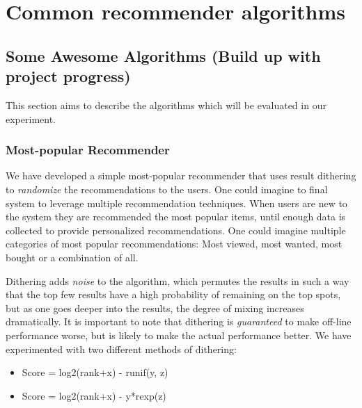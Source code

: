 
\section{Common recommender algorithms}




\subsection{Some Awesome Algorithms (Build up with project progress)}

This section aims to describe the algorithms which will be evaluated in our experiment.

\subsubsection{Most-popular Recommender}

We have developed a simple most-popular recommender that uses result dithering to \emph{randomize} the recommendations to the users. One could imagine to final system to leverage multiple recommendation techniques. When users are new to the system they are recommended the most popular items, until enough data is collected to provide personalized recommendations. One could imagine multiple categories of most popular recommendations: Most viewed, most wanted, most bought or a combination of all.

Dithering adds \emph{noise} to the algorithm, which permutes the results in such a way that the top few results have a high probability of remaining on the top spots, but as one goes deeper into the results, the degree of mixing increases dramatically. It is important to note that dithering is \emph{guaranteed} to make off-line performance worse, but is likely to make the actual performance better. We have experimented with two different methods of dithering:

\begin{itemize}
\item Score = log2(rank+x) - runif(y, z)
\item Score = log2(rank+x) - y*rexp(z)
\end{itemize}

